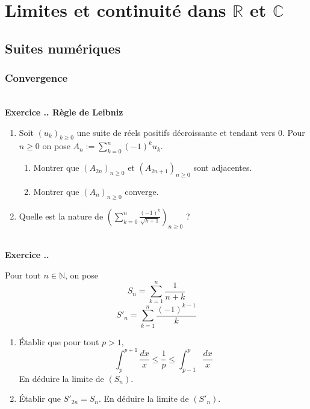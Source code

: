 \documentclass{article}
\newcommand{\mb}[1]{\mathbb{#1}}
\newcounter{exo}
\newcommand{\exercice}[1][\null]{\textbf{\\ Exercice \thesection.\theexo. #1} \addtocounter{exo}{1}}
\begin{document}
\section{Limites et continuité dans $\mb{R}$ et $\mb{C}$}

\subsection{Suites numériques}

\subsubsection{Convergence}

\exercice[Règle de Leibniz]

\begin{enumerate}

\item Soit $(u_k)_{k \ge 0}$ une suite de réels positifs décroissante et tendant vers $0$. Pour $n \ge 0$ on pose $\displaystyle A_n := \sum_{k=0}^n (-1)^{k} u_k$.


\begin{enumerate}

\item Montrer que $(A_{2n})_{n \ge 0}$ et $(A_{2n+1})_{n \ge 0}$ sont adjacentes.

\item Montrer que $(A_n)_{n \ge 0}$ converge.

\end{enumerate}

\item Quelle est la nature de $\displaystyle \left(\sum_{k=0}^n \frac{(-1)^{k}}{\sqrt{k+1}}\right)_{n \ge 0}$ ?

\end{enumerate}

\exercice

Pour tout $n \in \mb{N}$, on pose
\begin{equation*}
    S_{n} = \sum_{k = 1}^{n} \frac{1}{n + k}
\end{equation*}
\begin{equation*}
    S'_{n} = \sum_{k = 1}^{n} \frac{( - 1)^{k - 1}}{k}
\end{equation*}
\begin{enumerate}
    \item
    Établir que pour tout $p > 1$,
    \begin{equation*}
        \int_{p}^{p + 1} \frac{d x}{x} \leq \frac{1}{p} \leq \int_{p - 1}^{p} \frac{d x}{x}
    \end{equation*}
    En déduire la limite de $(S_{n})$.
    \item
    Établir que $S'_{2n} = S_{n}$. En déduire la limite de $(S'_{n})$.
\end{enumerate}
\end{document}
